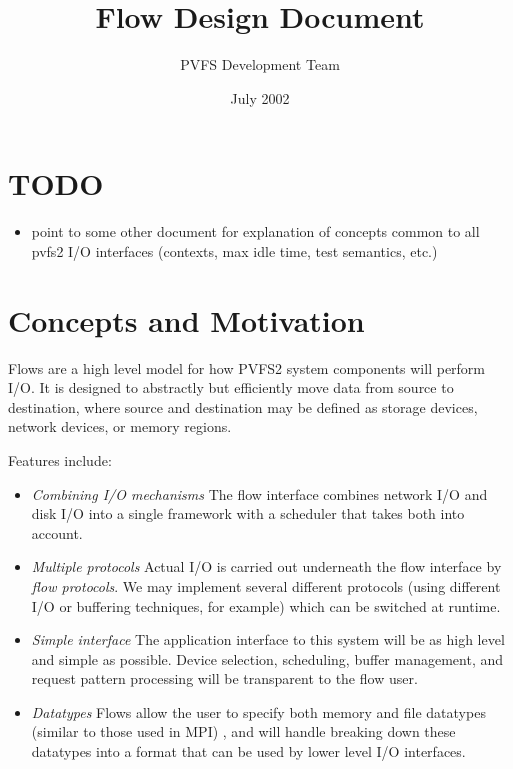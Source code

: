 \documentclass[12pt]{article} %
\title{Flow Design Document}
\author{PVFS Development Team}
\date{July 2002}
\begin{document}
\maketitle

\section{TODO}
\begin{itemize}
\item point to some other document for explanation of concepts common to all
pvfs2 I/O interfaces (contexts, max idle time, test semantics, etc.)
\end{itemize}

\section{Concepts and Motivation}

Flows are a high level model for how PVFS2 system components
will perform I/O.  It is designed to abstractly but efficiently move
data from source to destination, where source and destination may be
defined as storage devices, network devices, or memory regions.

Features include:

\begin{itemize}

\item \emph{Combining I/O mechanisms}  The flow interface combines
network I/O and disk I/O into a single framework with a scheduler that takes
both into account.

\item \emph{Multiple protocols}
Actual I/O is carried out underneath the flow interface by
\emph{flow protocols}.   We may implement several different
protocols (using different I/O or buffering techniques, for example)
which can be switched at runtime.

\item \emph{Simple interface}  The application interface to
this system will be as high level and simple as possible.  Device
selection, scheduling, buffer management, and request pattern
processing will be transparent to the flow user.  

\item \emph{Datatypes}  Flows allow the user to specify both memory
and file datatypes (similar to those used in MPI) , and will handle
breaking down these datatypes into a format that can be used by lower
level I/O interfaces.

\end{itemize}
\end{document}
